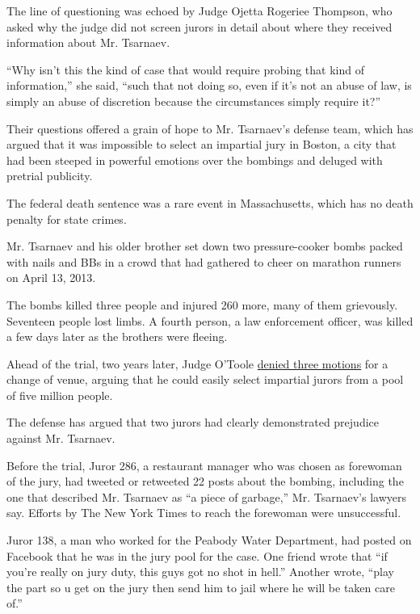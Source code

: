 The line of questioning was echoed by Judge Ojetta Rogeriee Thompson,
who asked why the judge did not screen jurors in detail about where they
received information about Mr. Tsarnaev.

``Why isn't this the kind of case that would require probing that kind
of information,'' she said, ``such that not doing so, even if it's not
an abuse of law, is simply an abuse of discretion because the
circumstances simply require it?''

Their questions offered a grain of hope to Mr. Tsarnaev's defense team,
which has argued that it was impossible to select an impartial jury in
Boston, a city that had been steeped in powerful emotions over the
bombings and deluged with pretrial publicity.

The federal death sentence was a rare event in Massachusetts, which has
no death penalty for state crimes.

Mr. Tsarnaev and his older brother set down two pressure-cooker bombs
packed with nails and BBs in a crowd that had gathered to cheer on
marathon runners on April 13, 2013.

The bombs killed three people and injured 260 more, many of them
grievously. Seventeen people lost limbs. A fourth person, a law
enforcement officer, was killed a few days later as the brothers were
fleeing.

Ahead of the trial, two years later, Judge O'Toole
\href{https://www.nytimes.com/2014/09/25/us/trial-of-marathon-bombing-suspect-to-remain-in-boston-judge-rules.html?searchResultPosition=6}{denied
three motions} for a change of venue, arguing that he could easily
select impartial jurors from a pool of five million people.

The defense has argued that two jurors had clearly demonstrated
prejudice against Mr. Tsarnaev.

Before the trial, Juror 286, a restaurant manager who was chosen as
forewoman of the jury, had tweeted or retweeted 22 posts about the
bombing, including the one that described Mr. Tsarnaev as ``a piece of
garbage,'' Mr. Tsarnaev's lawyers say. Efforts by The New York Times to
reach the forewoman were unsuccessful.

Juror 138, a man who worked for the Peabody Water Department, had posted
on Facebook that he was in the jury pool for the case. One friend wrote
that ``if you're really on jury duty, this guys got no shot in hell.''
Another wrote, ``play the part so u get on the jury then send him to
jail where he will be taken care of.''

